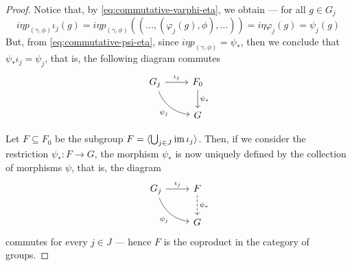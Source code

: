 \begin{proof}
    Notice that, by \cref{eq:commutative-varphi-eta}, we obtain --- for all \(g \in
    G_j\)
    \[
        i \eta p_{(\gamma, \phi)} \iota_j(g)
        = i \eta p_{(\gamma, \phi)}((\dots, (\varphi_j(g), \phi), \dots))
        = i \eta \varphi_j(g)
        = \psi_j(g)
    \]
    But, from \cref{eq:commutative-psi-eta}, since \(i \eta p_{(\gamma, \phi)} =
    \psi_{*}\), then we conclude that \(\psi_{*} \iota_j = \psi_j\), that is, the
    following diagram commutes
    \[
        \begin{tikzcd}
            G_j \ar[r, "\iota_j"] \ar[dr, bend right, swap, "\psi_j"]
            &F_0 \ar[d, "\psi_{*}"] \\
            &G
        \end{tikzcd}
    \]

    Let \(F \subseteq F_0\) be the subgroup \(F = \langle \bigcup_{j \in J} \operatorname{im}
    \iota_j \rangle\). Then, if we consider the restriction \(\psi_{*}: F \to G\),
    the morphism \(\psi_{*}\) is now uniquely defined by the collection of morphisms
    \(\psi\), that is, the diagram
    \[
        \begin{tikzcd}
            G_j \ar[r, "\iota_j"] \ar[dr, bend right, swap, "\psi_j"]
            &F \ar[d, dashed, "\psi_{*}"] \\
            &G
        \end{tikzcd}
    \]
    commutes for every \(j \in J\) --- hence \(F\) is the coproduct in the category
    of groups.
\end{proof}


